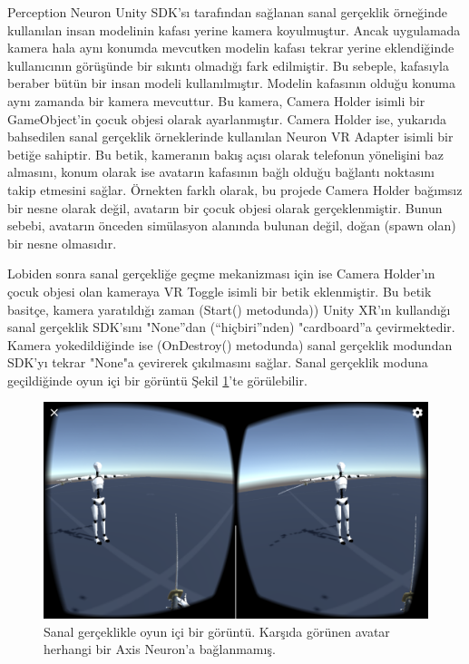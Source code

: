 \documentclass[a4paper, 12pt, titlepage]{article}
\begin{document}
Perception Neuron Unity SDK'sı tarafından sağlanan sanal gerçeklik örneğinde kullanılan insan
modelinin kafası yerine kamera koyulmuştur. Ancak uygulamada kamera hala aynı konumda mevcutken
modelin kafası tekrar yerine eklendiğinde kullanıcının görüşünde bir sıkıntı olmadığı fark
edilmiştir. Bu sebeple, kafasıyla beraber bütün bir insan modeli kullanılmıştır. Modelin kafasının
olduğu konuma aynı zamanda bir kamera mevcuttur. Bu kamera, Camera Holder isimli bir GameObject’in
çocuk objesi olarak ayarlanmıştır. Camera Holder ise, yukarıda bahsedilen sanal gerçeklik
örneklerinde kullanılan Neuron VR Adapter isimli bir betiğe sahiptir. Bu betik, kameranın bakış
açısı olarak telefonun yönelişini baz almasını, konum olarak ise avatarın kafasının bağlı olduğu
bağlantı noktasını takip etmesini sağlar. Örnekten farklı olarak, bu projede Camera Holder bağımsız
bir nesne olarak değil, avatarın bir çocuk objesi olarak gerçeklenmiştir. Bunun sebebi, avatarın
önceden simülasyon alanında bulunan değil, doğan (spawn olan) bir nesne olmasıdır.

Lobiden sonra sanal gerçekliğe geçme mekanizması için ise Camera Holder’ın çocuk objesi olan
kameraya VR Toggle isimli bir betik eklenmiştir. Bu betik basitçe, kamera yaratıldığı zaman
(Start() metodunda)) Unity XR’ın kullandığı sanal gerçeklik SDK’sını "None”dan (“hiçbiri”nden)
"cardboard”a çevirmektedir. Kamera yokedildiğinde ise (OnDestroy() metodunda) sanal gerçeklik
modundan SDK'yı tekrar "None"a çevirerek çıkılmasını sağlar. Sanal gerçeklik moduna geçildiğinde
oyun içi bir görüntü Şekil \ref{vr}’te görülebilir.

\begin{figure}[ht!]
    \centering
        \includegraphics[width=5in]{images/vr2}
    \caption{Sanal gerçeklikle oyun içi bir görüntü. Karşıda görünen avatar herhangi bir Axis        
             Neuron'a bağlanmamış.}
    \label{vr}
\end{figure}
\end{document}
